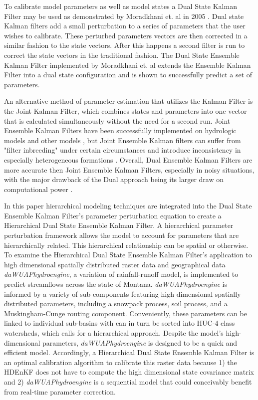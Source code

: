 	To calibrate model parameters as well as model states a Dual State Kalman Filter may be used as demonstrated by Moradkhani et. al in 2005 \cite{Moradkhani2005}. Dual state Kalman filters add a small perturbation to a series of parameters that the user wishes to calibrate. These perturbed parameters vectors are then corrected in a similar fashion to the state vectors. After this happens a second filter is run to correct the state vectors in the traditional fashion. The Dual State Ensemble Kalman Filter implemented by Moradkhani et. al\cite{Moradkhani2005} extends the Ensemble Kalman Filter into a dual state configuration and is shown to successfully predict a set of parameters.
	
	An alternative method of parameter estimation that utilizes the Kalman Filter is the Joint Kalman Filter, which combines states and parameters into one vector that is calculated simultaneously without the need for a second run. Joint Ensemble Kalman Filters have been successfully implemented on hydrologic models \cite{Vrugt2005} and other models \cite{Chen2008}, but Joint Ensemble Kalman filters can suffer from "filter inbreeding" under certain circumstances \cite{HendricksFranssen2008} and introduce inconsistency in especially heterogeneous formations \cite{Wen2006}. Overall, Dual Ensemble Kalman Filters are more accurate then Joint Ensemble Kalman Filters, especially in noisy situations, with the major drawback of the Dual approach being its larger draw on computational power \cite{Mariani2005}.
	
	In this paper hierarchical modeling techniques are integrated into the Dual State Ensemble Kalman Filter's parameter perturbation equation to create a Hierarchical Dual State Ensemble Kalman Filter. A hierarchical parameter perturbation framework allows the model to account for parameters that are hierarchically related. This hierarchical relationship can be spatial or otherwise. To examine the Hierarchical Dual State Ensemble Kalman Filter's application to high dimensional spatially distributed raster data and geographical data \textit{daWUAPhydroengine}, a variation of rainfall-runoff model, is implemented to predict streamflows across the state of Montana. \textit{daWUAPhydroengine} is informed by a variety of sub-components featuring high dimensional spatially distributed parameters, including a snowpack process, soil process, and a Muskingham-Cunge routing component. Conveniently, these parameters can be linked to individual sub-basins with can in turn be sorted into HUC-4 class watersheds, which calls for a hierarchical approach. Despite the model's high-dimensional parameters, \textit{daWUAPhydroengine} is designed to be a quick and efficient model. Accordingly, a Hierarchical Dual State Ensemble Kalman Filter is an optimal calibration algorithm to calibrate this raster data because 1) the HDEnKF does not have to compute the high dimensional state covariance matrix and 2) \textit{daWUAPhydroengine} is a sequential model that could conceivably benefit from real-time parameter correction.
	
